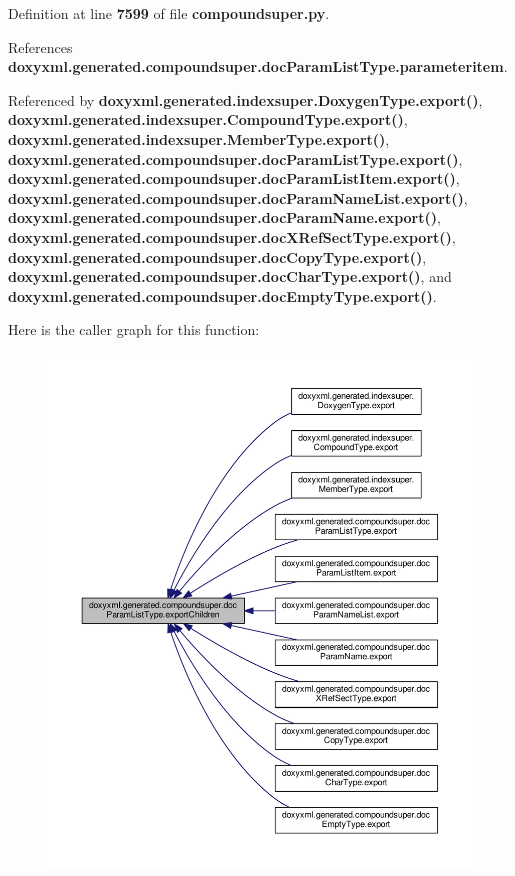 Definition at line {\bf 7599} of file {\bf compoundsuper.\+py}.



References {\bf doxyxml.\+generated.\+compoundsuper.\+doc\+Param\+List\+Type.\+parameteritem}.



Referenced by {\bf doxyxml.\+generated.\+indexsuper.\+Doxygen\+Type.\+export()}, {\bf doxyxml.\+generated.\+indexsuper.\+Compound\+Type.\+export()}, {\bf doxyxml.\+generated.\+indexsuper.\+Member\+Type.\+export()}, {\bf doxyxml.\+generated.\+compoundsuper.\+doc\+Param\+List\+Type.\+export()}, {\bf doxyxml.\+generated.\+compoundsuper.\+doc\+Param\+List\+Item.\+export()}, {\bf doxyxml.\+generated.\+compoundsuper.\+doc\+Param\+Name\+List.\+export()}, {\bf doxyxml.\+generated.\+compoundsuper.\+doc\+Param\+Name.\+export()}, {\bf doxyxml.\+generated.\+compoundsuper.\+doc\+X\+Ref\+Sect\+Type.\+export()}, {\bf doxyxml.\+generated.\+compoundsuper.\+doc\+Copy\+Type.\+export()}, {\bf doxyxml.\+generated.\+compoundsuper.\+doc\+Char\+Type.\+export()}, and {\bf doxyxml.\+generated.\+compoundsuper.\+doc\+Empty\+Type.\+export()}.



Here is the caller graph for this function\+:
\nopagebreak
\begin{figure}[H]
\begin{center}
\leavevmode
\includegraphics[width=350pt]{d2/d0c/classdoxyxml_1_1generated_1_1compoundsuper_1_1docParamListType_acc16256db7f8900a6f7ca933addca361_icgraph}
\end{center}
\end{figure}


